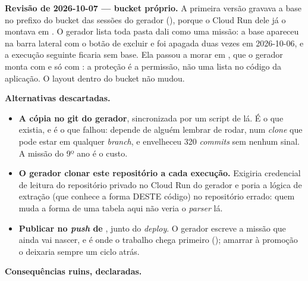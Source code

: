 \textbf{Revisão de 2026-10-07 --- bucket próprio.} A primeira versão gravava a
base no prefixo  do bucket das sessões do gerador
(), porque o Cloud Run dele já o montava em
. O gerador lista toda pasta dali como uma missão: a base
apareceu na barra lateral com o botão de excluir e foi apagada duas vezes em
2026-10-06, e a execução seguinte ficaria sem base. Ela passou a morar em
, que o gerador monta com
 e só com : a proteção é a permissão, não uma
lista no código da aplicação. O layout dentro do bucket não mudou.

\textbf{Alternativas descartadas.}

\begin{itemize}
  \item \textbf{A cópia no git do gerador}, sincronizada por um script de lá.
    É o que existia, e é o que falhou: depende de alguém lembrar de rodar,
    num \emph{clone} que pode estar em qualquer \emph{branch}, e envelheceu
    320 \emph{commits} sem nenhum sinal. A missão do 9º ano é o custo.
  \item \textbf{O gerador clonar este repositório a cada execução.} Exigiria
    credencial de leitura do repositório privado no Cloud Run do gerador e
    poria a lógica de extração (que conhece a forma DESTE código) no repositório
    errado: quem muda a forma de uma tabela aqui não veria o \emph{parser} lá.
  \item \textbf{Publicar no \emph{push} de }, junto do \emph{deploy}.
    O gerador escreve a missão que ainda vai nascer, e  é onde o
    trabalho chega primeiro (); amarrar à promoção o deixaria
    sempre um ciclo atrás.
\end{itemize}

\textbf{Consequências ruins, declaradas.}

